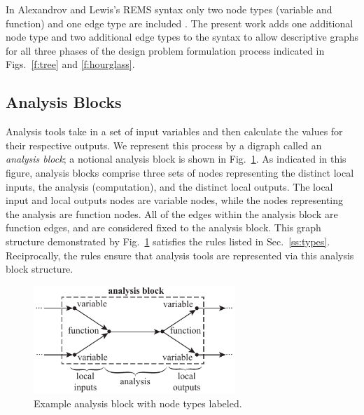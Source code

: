   In Alexandrov and Lewis's REMS syntax only two node types (variable and function) 
  and one edge type are included \cite{alexandrov2004}. The present work adds one additional 
  node type and two additional edge types to the syntax to allow descriptive
  graphs for all three phases of the design problem formulation process indicated in Figs.~\ref{f:tree} and \ref{f:hourglass}.

\subsection{Analysis Blocks}
\label{ss:analysis blocks}
  Analysis tools take in a set of input variables and then calculate 
  the values for their respective outputs. We represent this process
  by a digraph called an \emph{analysis block}; a notional analysis block is shown in Fig.~\ref{f:analysis block}. 
  As indicated in this figure, analysis blocks comprise three sets of nodes 
  representing the distinct local inputs, the analysis (computation), and the 
  distinct local outputs. The local input and local outputs nodes are variable 
  nodes, while the nodes representing the analysis are function nodes. All of 
  the edges within the analysis block are function edges, and are considered 
  fixed to the analysis block. This graph structure demonstrated by 
  Fig.~\ref{f:analysis block} satisfies the rules listed in Sec.~\ref{ss:types}. 
  Reciprocally, the rules ensure that analysis tools are represented via this analysis block structure.

  \begin{figure}[htb]
      \begin{center}
      \includegraphics[width=3.0in]{images/analysis_block}
      \end{center}
      \vspace{-10pt}
  \caption{Example analysis block with node types labeled.}
  \label{f:analysis block}
  \end{figure}

